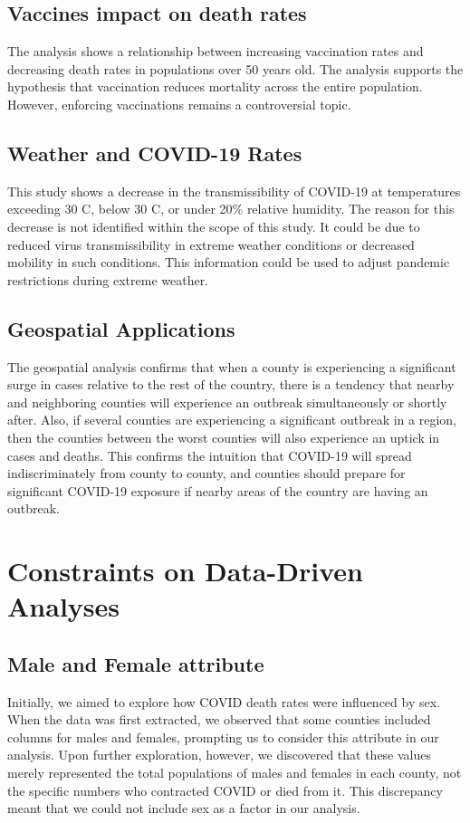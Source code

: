 \documentclass[sigconf,screen,nonacm]{acmart}
\begin{document}
\subsection{Vaccines impact on death rates}
The analysis shows a relationship between increasing vaccination rates and decreasing death rates in populations over 50 years old. The analysis supports the hypothesis that vaccination reduces mortality across the entire population. However, enforcing vaccinations remains a controversial topic.


\subsection{Weather and COVID-19 Rates}
This study shows a decrease in the transmissibility of COVID-19 at temperatures exceeding 30\textdegree{} C, below 30\textdegree{} C, or under 20\% relative humidity. The reason for this decrease is not identified within the scope of this study. It could be due to reduced virus transmissibility in extreme weather conditions or decreased mobility in such conditions. This information could be used to adjust pandemic restrictions during extreme weather.

\subsection{Geospatial Applications}
The geospatial analysis confirms that when a county is experiencing a significant surge in cases relative to the rest of the country, there is a tendency that nearby and neighboring counties will experience an outbreak simultaneously or shortly after. Also, if several counties are experiencing a significant outbreak in a region, then the counties between the worst counties will also experience an uptick in cases and deaths. This confirms the intuition that COVID-19 will spread indiscriminately from county to county, and counties should prepare for significant COVID-19 exposure if nearby areas of the country are having an outbreak.

\section{Constraints on Data-Driven Analyses}

\subsection{Male and Female attribute}
Initially, we aimed to explore how COVID death rates were influenced by sex. When the data was first extracted, we observed that some counties included columns for males and females, prompting us to consider this attribute in our analysis. Upon further exploration, however, we discovered that these values merely represented the total populations of males and females in each county, not the specific numbers who contracted COVID or died from it. This discrepancy meant that we could not include sex as a factor in our analysis.
\end{document}
